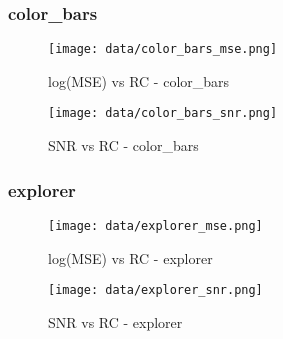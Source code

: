 \documentclass[12pt,a4paper]{article}
\begin{document}
\subsubsection{color\_bars}
\hspace*{-2.5em}
\begin{minipage}{0.5\textwidth}
        \centering
        \begin{figure}[H]
    \centering
    \texttt{[image: data/color\_bars\_mse.png]}
    \caption{log(MSE) vs RC - color\_bars}
    
\end{figure}
\end{minipage}\hfill
    \begin{minipage}{0.5\textwidth}
        \centering
        \begin{figure}[H]
    \centering
    \texttt{[image: data/color\_bars\_snr.png]}
    \caption{SNR vs RC - color\_bars}
    
\end{figure}
\end{minipage}

\subsubsection{explorer}
\hspace*{-2.5em}
\begin{minipage}{0.5\textwidth}
        \centering
        \begin{figure}[H]
    \centering
    \texttt{[image: data/explorer\_mse.png]}
    \caption{log(MSE) vs RC - explorer}
    
\end{figure}
\end{minipage}\hfill
    \begin{minipage}{0.5\textwidth}
        \centering
        \begin{figure}[H]
    \centering
    \texttt{[image: data/explorer\_snr.png]}
    \caption{SNR vs RC - explorer}
    
\end{figure}
\end{minipage}
\end{document}

